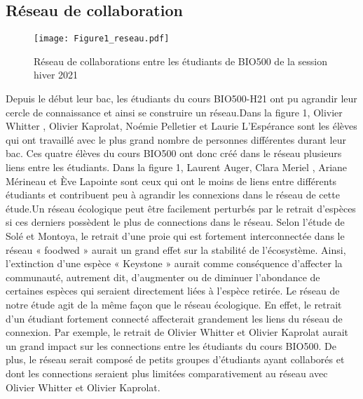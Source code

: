 \documentclass[12pt]{article}
\begin{document}
\begin{multicols}{2}
\subsection{Réseau de collaboration}
\begin{figure}[H]
\centering
\texttt{[image: Figure1\_reseau.pdf]}
\caption{Réseau de collaborations entre les étudiants de BIO500 de la session hiver 2021}
   \label{fig1}
      \end{figure}
Depuis le début leur bac, les étudiants du cours BIO500-H21 ont pu agrandir leur cercle de connaissance et ainsi se construire un réseau.Dans la figure 1, Olivier Whitter , Olivier Kaprolat, Noémie Pelletier et Laurie L’Espérance sont les élèves qui ont travaillé avec le plus grand nombre de personnes différentes durant leur bac. Ces quatre élèves du cours BIO500 ont donc créé dans le réseau plusieurs liens entre les étudiants. Dans la figure 1, Laurent Auger, Clara Meriel , Ariane Mérineau et Ève Lapointe sont ceux qui ont le moins de liens entre différents étudiants et contribuent peu à agrandir les connexions dans le réseau de cette étude.Un réseau écologique peut être facilement perturbés par le retrait d’espèces si ces derniers possèdent le plus de connections dans le réseau\cite{Sole2001}. Selon l’étude de Solé et Montoya, le retrait d’une proie qui est fortement interconnectée dans le réseau « foodwed » aurait un grand effet sur la stabilité de l’écosystème. Ainsi, l’extinction d’une espèce « Keystone » aurait comme conséquence d’affecter la communauté, autrement dit, d’augmenter ou de diminuer l’abondance de certaines espèces qui seraient directement liées à l’espèce retirée. Le réseau de notre étude agit de la même façon que le réseau écologique. En effet, le retrait d’un étudiant fortement connecté affecterait grandement les liens du réseau de connexion. Par exemple, le retrait de Olivier Whitter et Olivier Kaprolat aurait un grand impact sur les connections entre les étudiants du cours BIO500. De plus, le réseau serait composé de petits groupes d’étudiants ayant collaborés et dont les connections seraient plus limitées comparativement au réseau avec Olivier Whitter et Olivier Kaprolat.

\end{multicols}
\end{document}
